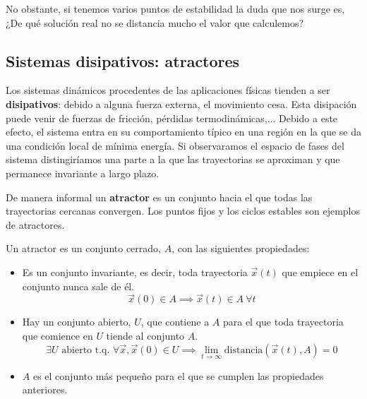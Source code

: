 No obstante, si tenemos varios puntos de estabilidad la duda que nos surge es, ¿De qué solución real no se distancia mucho el valor que calculemos?

\subsection{Sistemas disipativos: atractores}
Los sistemas dinámicos procedentes de las aplicaciones físicas tienden a ser \textbf{disipativos}: debido a alguna fuerza externa, el movimiento cesa. Esta disipación puede venir de fuerzas de fricción, pérdidas termodinámicas,... Debido a este efecto, el sistema entra en su comportamiento típico en una región en la que se da una condición local de mínima energía. Si observaramos el espacio de fases del sistema distingiríamos una parte a la que las trayectorias se aproximan y que permanece invariante a largo plazo.

De manera informal un \textbf{atractor} es un conjunto hacia el que todas las trayectorias cercanas convergen. Los puntos fijos y los ciclos estables son ejemplos de atractores.

\begin{definition}[Atractor]
Un atractor es un conjunto cerrado, $A$, con las siguientes propiedades:
\begin{itemize}
\item Es un conjunto invariante, es decir, toda trayectoria $\vec{x}(t)$ que empiece en el conjunto nunca sale de él.
\[\vec{x}(0) \in A \implies \vec{x}(t) \in A \ \forall t\]
\item Hay un conjunto abierto, $U$, que contiene a $A$ para el que toda trayectoria que comience en $U$ tiende al conjunto $A$.
\[\exists U \text{ abierto t.q. } \forall \vec{x}, \vec{x}(0) \in U \implies \lim_{t\to \infty}\text{distancia}(\vec{x}(t),A) = 0\]
\item $A$ es el conjunto más pequeño para el que se cumplen las propiedades anteriores.
\end{itemize}
\end{definition}

